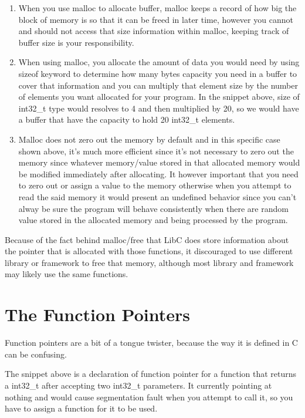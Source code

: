 \begin{enumerate}
	\item When you use malloc to allocate buffer, malloc keeps a record of how big the block of memory is so that it can be freed in later time, however you cannot and should not access that size information within malloc, keeping track of buffer size is your responsibility.
	
	\item When using malloc, you allocate the amount of data you would need by using sizeof keyword to determine how many bytes capacity you need in a buffer to cover that information and you can multiply that element size by the number of elements you want allocated for your program. In the snippet above, size of int32\_t type would resolves to 4 and then multiplied by 20, so we would have a buffer that have the capacity to hold 20 int32\_t elements.
	
	\item Malloc does not zero out the memory by default and in this specific case shown above, it's much more efficient since it's not necessary to zero out the memory since whatever memory/value stored in that allocated memory would be modified immediately after allocating. It however important that you need to zero out or assign a value to the memory otherwise when you attempt to read the said memory it would present an undefined behavior since you can't alway be sure the program will behave consistently when there are random value stored in the allocated memory and being processed by the program.
\end{enumerate}

Because of the fact behind malloc/free that LibC does store information about the pointer that is allocated with those functions, it discouraged to use different library or framework to free that memory, although most library and framework may likely use the same functions.
\newpage
\section{The Function Pointers}
Function pointers are a bit of a tongue twister, because the way it is defined in C can be confusing.



The snippet above is a declaration of function pointer for a function that returns a int32\_t after accepting two int32\_t parameters. It currently pointing at nothing and would cause segmentation fault when you attempt to call it, so you have to assign a function for it to be used.

